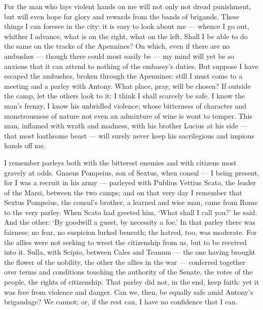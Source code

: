  For the man who lays violent hands on me will not only not dread punishment, but will even hope for glory and rewards from the bands of brigands. These things I can foresee in the city: it is easy to look about me --- whence I go out, whither I advance, what is on the right, what on the left. Shall I be able to do the same on the tracks of the Apennines? On which, even if there are no ambushes --- though there could most easily be --- my mind will yet be so anxious that it can attend to nothing of the embassy's duties. But suppose I have escaped the ambushes, broken through the Apennines: still I must come to a meeting and a parley with Antony. What place, pray, will be chosen? If outside the camp, let the others look to it: I think I shall scarcely be safe. I know the man's frenzy, I know his unbridled violence; whose bitterness of character and monstrousness of nature not even an admixture of wine is wont to temper. This man, inflamed with wrath and madness, with his brother Lucius at his side --- that most loathsome beast --- will surely never keep his sacrilegious and impious hands off me.

 I remember parleys both with the bitterest enemies and with citizens most gravely at odds. Gnaeus Pompeius, son of Sextus, when consul --- I being present, for I was a recruit in his army --- parleyed with Publius Vettius Scato, the leader of the Marsi, between the two camps; and on that very day I remember that Sextus Pompeius, the consul's brother, a learned and wise man, came from Rome to the very parley. When Scato had greeted him, `What shall I call you?' he said. And the other: `By goodwill a guest, by necessity a foe.' In that parley there was fairness; no fear, no suspicion lurked beneath; the hatred, too, was moderate. For the allies were not seeking to wrest the citizenship from us, but to be received into it. Sulla, with Scipio, between Cales and Teanum --- the one having brought the flower of the nobility, the other the allies in the war --- conferred together over terms and conditions touching the authority of the Senate, the votes of the people, the rights of citizenship. That parley did not, in the end, keep faith: yet it was free from violence and danger. Can we, then, be equally safe amid Antony's brigandage? We cannot; or, if the rest can, I have no confidence that I can.

